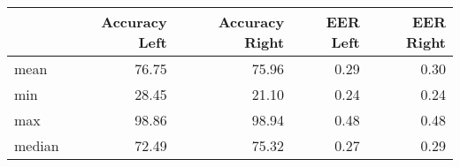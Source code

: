 \begin{tabular}{lrrrr}
\toprule
{} &  Accuracy Left &  Accuracy Right &  EER Left &  EER Right \\
\midrule
mean   &          76.75 &           75.96 &      0.29 &       0.30 \\
min    &          28.45 &           21.10 &      0.24 &       0.24 \\
max    &          98.86 &           98.94 &      0.48 &       0.48 \\
median &          72.49 &           75.32 &      0.27 &       0.29 \\
\bottomrule
\end{tabular}
